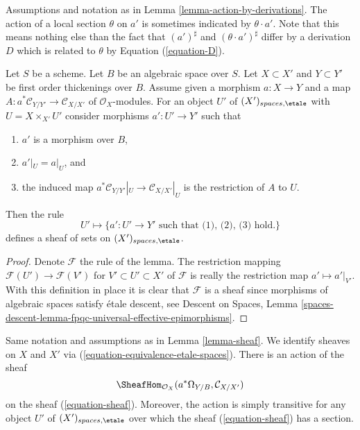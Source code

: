 \begin{remark}
\label{remark-action-by-derivations}
Assumptions and notation as in Lemma \ref{lemma-action-by-derivations}.
The action of a local section $\theta$ on $a'$ is sometimes indicated by
$\theta \cdot a'$. Note that this means nothing else than the fact
that $(a')^\sharp$ and $(\theta \cdot a')^\sharp$ differ by a derivation
$D$ which is related to $\theta$ by Equation (\ref{equation-D}).
\end{remark}

\begin{lemma}
\label{lemma-sheaf}
Let $S$ be a scheme. Let $B$ be an algebraic space over $S$.
Let $X \subset X'$ and $Y \subset Y'$ be first order thickenings
over $B$. Assume given a morphism $a : X \to Y$ and a map
$A : a^*\mathcal{C}_{Y/Y'} \to \mathcal{C}_{X/X'}$ of
$\mathcal{O}_X$-modules. For an object $U'$ of
$(X')_{spaces, \etale}$ with $U = X \times_{X'} U'$
consider morphisms $a' : U' \to Y'$ such that
\begin{enumerate}
\item $a'$ is a morphism over $B$,
\item $a'|_U = a|_U$, and
\item the induced map
$a^*\mathcal{C}_{Y/Y'}|_U \to \mathcal{C}_{X/X'}|_U$
is the restriction of $A$ to $U$.
\end{enumerate}
Then the rule
\begin{equation}
\label{equation-sheaf}
U' \mapsto
\{a' : U' \to Y'\text{ such that (1), (2), (3) hold.}\}
\end{equation}
defines a sheaf of sets on $(X')_{spaces, \etale}$.
\end{lemma}

\begin{proof}
Denote $\mathcal{F}$ the rule of the lemma.
The restriction mapping $\mathcal{F}(U') \to \mathcal{F}(V')$ for
$V' \subset U' \subset X'$
of $\mathcal{F}$ is really the restriction map $a' \mapsto a'|_{V'}$.
With this definition in place it is clear that $\mathcal{F}$ is a
sheaf since morphisms of algebraic spaces satisfy \'etale descent, see
Descent on Spaces,
Lemma \ref{spaces-descent-lemma-fpqc-universal-effective-epimorphisms}.
\end{proof}

\begin{lemma}
\label{lemma-action-sheaf}
Same notation and assumptions as in Lemma \ref{lemma-sheaf}.
We identify sheaves on $X$ and $X'$ via
(\ref{equation-equivalence-etale-spaces}).
There is an action of the sheaf
$$
\SheafHom_{\mathcal{O}_X}(a^*\Omega_{Y/B}, \mathcal{C}_{X/X'})
$$
on the sheaf (\ref{equation-sheaf}). Moreover, the action
is simply transitive for any object $U'$ of $(X')_{spaces, \etale}$
over which the sheaf (\ref{equation-sheaf}) has a section.
\end{lemma}

